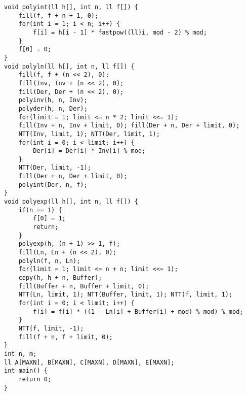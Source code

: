 \begin{lstlisting}
void polyint(ll h[], int n, ll f[]) {
	fill(f, f + n + 1, 0);
	for(int i = 1; i < n; i++) {
		f[i] = h[i - 1] * fastpow((ll)i, mod - 2) % mod;
	}
	f[0] = 0;
}
void polyln(ll h[], int n, ll f[]) {
	fill(f, f + (n << 2), 0);
	fill(Inv, Inv + (n << 2), 0);
	fill(Der, Der + (n << 2), 0);
	polyinv(h, n, Inv);
	polyder(h, n, Der);
	for(limit = 1; limit <= n * 2; limit <<= 1);
	fill(Inv + n, Inv + limit, 0); fill(Der + n, Der + limit, 0);
	NTT(Inv, limit, 1); NTT(Der, limit, 1);
	for(int i = 0; i < limit; i++) {
		Der[i] = Der[i] * Inv[i] % mod;
	}
	NTT(Der, limit, -1);
	fill(Der + n, Der + limit, 0);
	polyint(Der, n, f);	
}
void polyexp(ll h[], int n, ll f[]) {
	if(n == 1) {
		f[0] = 1;
		return;
	}
	polyexp(h, (n + 1) >> 1, f);
	fill(Ln, Ln + (n << 2), 0);
	polyln(f, n, Ln);
	for(limit = 1; limit <= n + n; limit <<= 1);
	copy(h, h + n, Buffer);
	fill(Buffer + n, Buffer + limit, 0);
	NTT(Ln, limit, 1); NTT(Buffer, limit, 1); NTT(f, limit, 1);
	for(int i = 0; i < limit; i++) {
		f[i] = f[i] * ((1 - Ln[i] + Buffer[i] + mod) % mod) % mod;
	}
	NTT(f, limit, -1);
	fill(f + n, f + limit, 0);
}
int n, m; 
ll A[MAXN], B[MAXN], C[MAXN], D[MAXN], E[MAXN];
int main() {
	return 0;
}
\end{lstlisting}